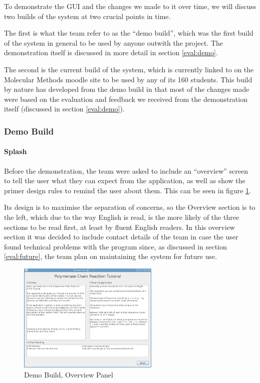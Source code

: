To demonstrate the GUI and the changes we made to it over time, we
will discuss two builds of the system at two crucial points in time.

The first is what the team refer to as the ``demo build'', which was
the first build of the system in general to be used by anyone outwith
the project.
The demonstration itself is discussed in more detail in section
\ref{eval:demo}.

The second is the current build of the system, which is currently
linked to on the Molecular Methods moodle site to be used by any of
its 160 students.
This build by nature has developed from the demo build in that most of
the changes made were based on the evaluation and feedback we received
from the demonstration itself (discussed in section \ref{eval:demo}).

\subsubsection{Demo Build}

\paragraph{Splash}

Before the demonstration, the team were asked to include an
``overview'' screen to tell the user what they can expect from the
application, as well as show the primer design rules to remind the
user about them.
This can be seen in figure \ref{fig:demoBuild:splash}.

Its design is to maximise the separation of concerns, so the Overview
section is to the left, which due to the way English is read, is the
more likely of the three sections to be read first, at least by fluent
English readers.
In this overview section it was decided to include contact details
of the team in case the user found technical problems with the
program since, as discussed in section \ref{eval:future}, the
team plan on maintaining the system for future use.

\begin{figure}[h]
  \begin{center}
    \includegraphics[width=0.6\textwidth]{./images/demoBuild/splash.png}
    \caption{
      \label{fig:demoBuild:splash}
      Demo Build, Overview Panel 
    }
  \end{center}
\end{figure}

